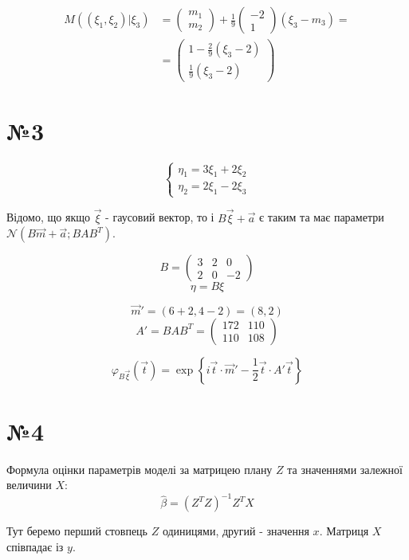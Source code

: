 \documentclass[11pt, a4paper]{article} %
\begin{document}
\begin{align*}
    M((\xi_1,\xi_2)|\xi_3) &= \begin{pmatrix}
        m_1 \\ m_2
    \end{pmatrix} + \frac{1}{9}\begin{pmatrix}
    -2 \\ 1
\end{pmatrix} (\xi_3 - m_3) = \\
    &= \begin{pmatrix}
        1 - \frac{2}{9} (\xi_3 - 2) \\
        \frac{1}{9} (\xi_3 - 2)
    \end{pmatrix}
\end{align*}
\pagebreak


\section*{№3}
$$\begin{cases}
    \eta_1 = 3\xi_1 + 2\xi_2\\
    \eta_2 = 2\xi_1 - 2\xi_3
\end{cases}$$

Відомо, що якщо $\vec\xi$ - гаусовий вектор, то і $B\vec\xi + \vec a$ є таким 
та має параметри $\mathcal N(B\vec m + \vec a; BAB^T)$.

$$B = \begin{pmatrix}
    3 & 2 & 0 \\
    2 & 0 & -2
\end{pmatrix}$$
$$\eta = B \xi$$

$$\vec m' = ( 6+2 , 4-2) = (8,2)$$
$$A' = BAB^T = \begin{pmatrix}
    172 & 110 \\
    110 & 108
\end{pmatrix}$$

$$\varphi_{B\vec\xi}(\vec t) = \exp \left\{ i\vec t \cdot \vec m' - \frac{1}{2} \vec t \cdot A' \vec t \right\}$$
\pagebreak

\section*{№4}

Формула оцінки параметрів моделі за матрицею плану $Z$ та значеннями залежної величини $X$:
$$\hat \beta = \left(Z^T Z\right)^{-1}Z^T X$$

Тут беремо перший стовпець $Z$ одиницями, другий - значення $x$.
Матриця $X$ співпадає із $y$.
\end{document}
